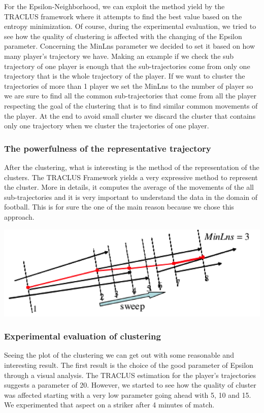 \documentclass{acm_proc_article-sp-sigmod07}
\begin{document}
For the Epsilon-Neighborhood, we can exploit the method yield by the TRACLUS framework where it attempts to find the best value based on the entropy minimization. Of course, during the experimental evaluation, we tried to see how the quality of clustering is affected with the changing of the Epsilon parameter.
Concerning the MinLns parameter we decided to set it based on how many player's trajectory we have.
Making an example if we check the sub trajectory of one player is enough that the sub-trajectories come from only one trajectory that is the whole trajectory of the player. If we want to cluster the trajectories of more than 1 player we set the MinLns to the number of player so we are sure to find all the common sub-trajectories that come from all the player respecting the goal of the clustering that is to find similar common movements of the player. At the end to avoid small cluster we discard the cluster that contains only one trajectory when we cluster the trajectories of one player.


\subsubsection{The powerfulness of the representative trajectory}
After the clustering, what is interesting is the method of the representation of the clusters. The TRACLUS Framework yields a very expressive method to represent the cluster.
More in details, it computes the average of the movements of the all sub-trajectories and it is very important to understand the data in the domain of football. This is for sure the one of the main reason because we chose this approach. 

\includegraphics[scale=0.73]{traclus3}

\subsubsection{Experimental evaluation of clustering}
Seeing the plot of the clustering we can get out with some reasonable and interesting result.
The first result is the choice of the good parameter of Epsilon through a visual analysis.
The TRACLUS estimation for the player's trajectories suggests a parameter of 20. However, we started to see how the quality of cluster was affected starting with a very low parameter going ahead with 5, 10 and 15. We experimented that aspect on a striker after 4 minutes of match.
\end{document}
